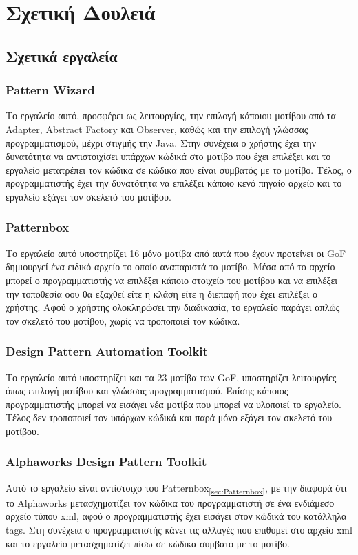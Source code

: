 \chapter{Σχετική Δουλειά}
\label{ch:relativeWork}
\section{Σχετικά εργαλεία}
\label{sec:relativeTools}
\subsection{Pattern Wizard}
\label{subsec:patternWizard}
Το εργαλείο\textsubscript{\cite{PatternBox}} αυτό, προσφέρει ως λειτουργίες, την επιλογή κάποιου μοτίβου 
από τα Adapter, Abstract Factory και Observer, καθώς και την επιλογή γλώσσας προγραμματισμού, μέχρι στιγμής την Java. Στην συνέχεια 
ο χρήστης έχει την δυνατότητα να αντιστοιχίσει υπάρχων κώδικά στο μοτίβο που έχει επιλέξει και το εργαλείο μετατρέπει τον κώδικα 
σε κώδικα που είναι συμβατός με το μοτίβο. Τέλος, ο προγραμματιστής έχει την δυνατότητα να επιλέξει κάποιο κενό πηγαίο αρχείο και 
το εργαλείο εξάγει τον σκελετό του μοτίβου.
\subsection{Patternbox}
\label{subsec:Patternbox}
Το εργαλείο\textsubscript{\cite{PatternBox}} αυτό υποστηρίζει 16 μόνο μοτίβα από αυτά που έχουν προτείνει οι GoF\textsubscript{\cite{GoF}} δημιουργεί ένα ειδικό 
αρχείο το οποίο αναπαριστά το μοτίβο. Μέσα από το αρχείο μπορεί ο προγραμματιστής να επιλέξει κάποιο στοιχείο του μοτίβου και 
να επιλέξει την τοποθεσία οου θα εξαχθεί είτε η κλάση είτε η διεπαφή που έχει επιλέξει ο χρήστης. 
Αφού ο χρήστης ολοκληρώσει την διαδικασία, το εργαλείο παράγει απλώς τον σκελετό του μοτίβου, χωρίς να τροποποιεί τον κώδικα.
\subsection{Design Pattern Automation Toolkit}
\label{subsec:dpa}
Το εργαλείο\textsubscript{\cite{PatternBox}} αυτό υποστηρίζει και τα 23 μοτίβα των GoF\textsubscript{\cite{GoF}}, υποστηρίζει λειτουργίες 
όπως επιλογή μοτίβου και γλώσσας προγραμματισμού. Επίσης κάποιος προγραμματιστής μπορεί να εισάγει νέα μοτίβα που μπορεί να υλοποιεί το εργαλείο.
Τέλος δεν τροποποιεί τον υπάρχων κώδικά και παρά μόνο εξάγει τον σκελετό του μοτίβου.
\subsection{Alphaworks Design Pattern Toolkit}
\label{subsec:ALPHAWORKS}
Αυτό το εργαλείο\textsubscript{\cite{PatternBox}} είναι αντίστοιχο του Patternbox\textsubscript{\ref{sec:Patternbox}}, με την διαφορά ότι το Alphaworks μετασχηματίζει τον κώδικα
του προγραμματιστή σε ένα ενδιάμεσο αρχείο τύπου xml, αφού ο προγραμματιστής έχει εισάγει στον κώδικά του κατάλληλα tags.
Στη συνέχεια ο προγραμματιστής κάνει τις αλλαγές που επιθυμεί στο αρχείο xml και το εργαλείο μετασχηματίζει πίσω σε κώδικα συμβατό με το μοτίβο.
